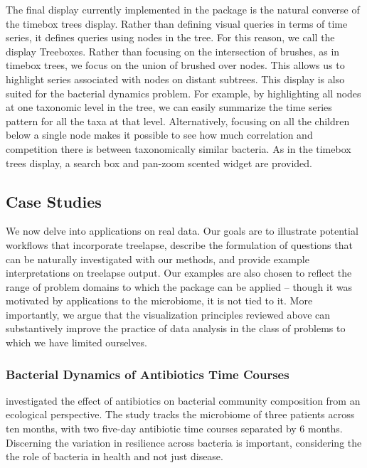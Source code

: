 \documentclass[12pt]{article}
\begin{document}
The final display currently implemented in the package is the natural
converse of the timebox trees display. Rather than defining visual
queries in terms of time series, it defines queries using nodes in the
tree. For this reason, we call the display Treeboxes. Rather than
focusing on the intersection of brushes, as in timebox trees, we focus
on the union of brushed over nodes. This allows us to highlight series
associated with nodes on distant subtrees. This display is also suited
for the bacterial dynamics problem. For example, by highlighting all
nodes at one taxonomic level in the tree, we can easily summarize the
time series pattern for all the taxa at that level. Alternatively,
focusing on all the children below a single node makes it possible to
see how much correlation and competition there is between taxonomically
similar bacteria. As in the timebox trees display, a search box and
pan-zoom scented widget are provided.

\subsection*{Case Studies}\label{case-studies}

We now delve into applications on real data. Our goals are to illustrate
potential workflows that incorporate treelapse, describe the formulation
of questions that can be naturally investigated with our methods, and
provide example interpretations on treelapse output. Our examples are
also chosen to reflect the range of problem domains to which the package
can be applied -- though it was motivated by applications to the
microbiome, it is not tied to it. More importantly, we argue that the
visualization principles reviewed above can substantively improve the
practice of data analysis in the class of problems to which we have
limited ourselves.

\subsubsection*{Bacterial Dynamics of Antibiotics Time
Courses}\label{bacterial-dynamics-of-antibiotics-time-courses}


\citet{dethlefsen2008pervasive} investigated the
effect of antibiotics on bacterial community composition from an
ecological perspective. The study tracks the microbiome of three
patients across ten months, with two five-day antibiotic time courses
separated by 6 months. Discerning the variation in resilience across
bacteria is important, considering the the role of bacteria in health
and not just disease.
\end{document}
